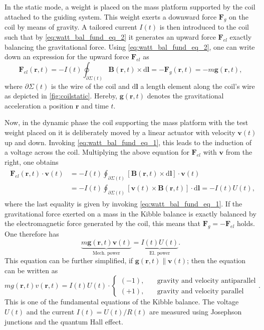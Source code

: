 \documentclass{report}
\numberwithin{tm}{section}
\newcommand\vect[1]{\ensuremath{\bm{#1}}}
\begin{document}
	In the static mode, a weight is placed on the mass platform supported by the coil attached to the guiding system. This weight exerts a downward force $\vect{F}_{g}$ on the coil by means of gravity. A tailored current $I(t)$ is then introduced to the coil such that by \cref{eq:watt_bal_fund_eq_2} it generates an upward force $\vect{F}_{el}$ exactly balancing the gravitational force. Using \cref{eq:watt_bal_fund_eq_2}, one can write down an expression for the upward force $\vect{F}_{el}$ as \begin{equation}
		\vect{F}_{el}(\vect{r},t) = -I(t)\oint_{\partial \Sigma(t)} \vect{B}(\vect{r},t) \times \mathrm{d}\vect{l} = -\vect{F}_g(\vect{r},t) = -m\vect{g}(\vect{r},t),
	\end{equation} where $\partial \Sigma(t)$ is the wire of the coil and $\mathrm{d}\vect{l}$ a length element along the coil's wire as depicted in \cref{fig:coilstatic}. Hereby, $\vect{g}(\vect{r},t)$ denotes the gravitational acceleration a position $\vect{r}$ and time $t$.
	
	Now, in the dynamic phase the coil supporting the mass platform with the test weight placed on it is deliberately moved by a linear actuator with velocity $\vect{v}(t)$ up and down. Invoking \cref{eq:watt_bal_fund_eq_1}, this leads to the induction of a voltage across the coil. Multiplying the above equation for $\vect{F}_{el}$ with $\vect{v}$ from the right, one obtains \begin{align}\begin{aligned}
		\vect{F}_{el}(\vect{r},t)\cdot \vect{v}(t) &= -I(t)\oint_{\partial \Sigma(t)} \left[\vect{B}(\vect{r},t) \times \mathrm{d}\vect{l}\right]\cdot \vect{v}(t) \\
		&= -I(t)\oint_{\partial \Sigma(t)} \left[ \vect{v}(t) \times \vect{B}(\vect{r},t)\right]\cdot \mathrm{d}\vect{l} = -I(t) U(t),
	\end{aligned}\end{align} where the last equality is given by invoking \cref{eq:watt_bal_fund_eq_1}. If the gravitational force exerted on a mass in the Kibble balance is exactly balanced by the electromagnetic force generated by the coil, this means that  $\vect{F}_g = -\vect{F}_{el}$ holds. One therefore has \begin{equation}\label{eq:wattbalance_without_rot_power}
	\underbrace{m\vect{g}(\vect{r},t)\vect{v}(t)}_{\text{Mech. power}} = \underbrace{I(t)U(t)}_{\text{El. power}}.
\end{equation} This equation can be further simplified, if $\vect{g}(\vect{r},t) \parallel \vect{v}(t)$; then the equation can be written as \begin{equation}\label{eq:fundamentalequation_almost}
mg(\vect{r},t)v(\vect{r},t) = I(t)U(t) \cdot \begin{cases}
	(-1), \quad &\text{gravity and velocity antiparallel} \\
	(+1), \quad &\text{gravity and velocity parallel}
\end{cases}.
\end{equation} This is one of the fundamental equations of the Kibble balance. The voltage $U(t)$ and the current $I(t) = U(t)/R(t)$ are measured using Josephson junctions and the quantum Hall effect. 
\end{document}
